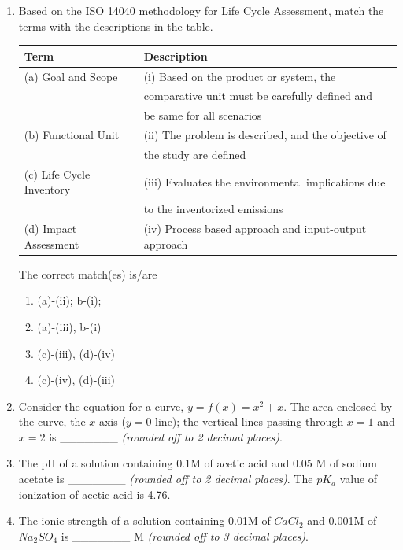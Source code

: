 \documentclass[journal]{IEEEtran}
\begin{document}
\begin{enumerate}
\item Based on the ISO 14040 methodology for Life Cycle Assessment, match the terms with the descriptions in the table.
\hfill{}
\begin{table}[H]
\centering
\begin{tabular}{|l|l|}
\hline
\textbf{Term} & \textbf{Description} \\
\hline
(a) Goal and Scope & (i) Based on the product or system, the \\& comparative unit must be carefully defined and \\& be same for all scenarios \\
\hline
(b) Functional Unit & (ii) The problem is described, and the objective of \\& the study are defined \\
\hline
(c) Life Cycle Inventory & (iii) Evaluates the environmental implications due \\& to the inventorized emissions \\
\hline
(d) Impact Assessment & (iv) Process based approach and input-output approach \\
\hline
\end{tabular}
\end{table}
The correct match(es) is/are
\begin{enumerate}
\item (a)-(ii); b-(i);
\item (a)-(iii), b-(i)
\item (c)-(iii), (d)-(iv)
\item (c)-(iv), (d)-(iii)
\end{enumerate}

\item Consider the equation for a curve, $y = f(x) = x^2 + x$. The area enclosed by the curve, the $x$-axis ($y = 0$ line); the vertical lines passing through $x = 1$ and $x = 2$ is \_\_\_\_\_\_\_ \textit{(rounded off to 2 decimal places)}.
\hfill{}

\item The pH of a solution containing 0.1M of acetic acid and 0.05 M of sodium acetate is \_\_\_\_\_\_\_ \textit{(rounded off to 2 decimal places)}. The $pK_{a}$ value of ionization of acetic acid is 4.76.
\hfill{}

\item The ionic strength of a solution containing 0.01M of $CaCl_{2}$ and 0.001M of $Na_{2}SO_{4}$ is \_\_\_\_\_\_\_ M \textit{(rounded off to 3 decimal places)}.
\hfill{}


\end{enumerate}
\end{document}

